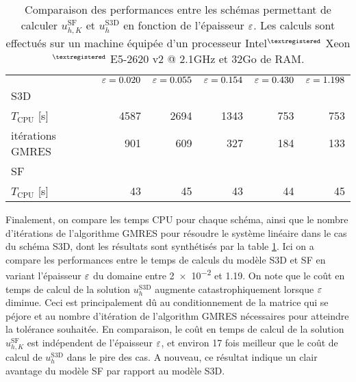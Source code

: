 \begin{table}[t!]
  \caption{Comparaison des performances entre les schémas permettant
    de calculer $u_{h,K}^{\mathrm{SF}}$ et $u_h^\mathrm{S3D}$ en
    fonction de l'épaisseur $\varepsilon$. Les calculs
    sont effectués sur un machine équipée d'un processeur Intel$^{\tiny{\textregistered}}$ Xeon$^{\tiny{\textregistered}}$
    E5-2620 v2 @ 2.1\si{\giga\hertz} et 32Go de RAM.}
  \label{tab:e-sf-e-s3d-cpu-cost}
  \begin{center}
    \begin{tabular}{@{}lrrrrr@{}}
      \toprule
      & $\varepsilon = 0.020$
      & $\varepsilon = 0.055$
      & $\varepsilon = 0.154$
      & $\varepsilon = 0.430$
      & $\varepsilon = 1.198$ \\
      \cmidrule{2-6}
      S3D  \\
      \hphantom{a} $T_\text{CPU}$ [\si{\second}] & 4587 & 2694 & 1343 & 753 & 753 \\
      \hphantom{a} itérations GMRES           & 901 & 609  & 327  & 184 & 133 \\
      SF \\
      \hphantom{a} $T_\text{CPU}$ [\si{\second}] & 43 & 45   & 43   & 44  & 45  \\
      \bottomrule
    \end{tabular}
  \end{center}
\end{table}

Finalement, on compare les temps CPU pour chaque schéma, ainsi
que le nombre d'itérations de l'algorithme GMRES pour résoudre le
système linéaire dans le cas du schéma S3D, dont les résultats sont
synthétisés par la table \ref{tab:e-sf-e-s3d-cpu-cost}. Ici on a
compare les performances entre le temps de calculs du modèle S3D et SF
en variant l'épaisseur $\varepsilon$ du domaine entre \num{2e-2} et
\num{1.19}. On note que le coût en temps de calcul de la solution
$u_h^\mathrm{S3D}$ augmente catastrophiquement lorsque $\varepsilon$
diminue. Ceci est principalement dû au conditionnement de la matrice
qui se péjore et au nombre d'itération de
l'algorithm GMRES nécessaires pour atteindre la tolérance souhaitée.
En comparaison, le coût en temps de calcul de la solution
$u_{h,K}^{\mathrm{SF}}$ est indépendent de l'épaisseur $\varepsilon$,
et environ 17 fois meilleur que le coût de calcul de
$u_h^\mathrm{S3D}$ dans le pire des cas. A nouveau, ce résultat
indique un clair avantage du modèle SF par rapport au modèle S3D.


\renewcommand{\floatpagefraction}{.6}%
\renewcommand{\topfraction}{0.7}
